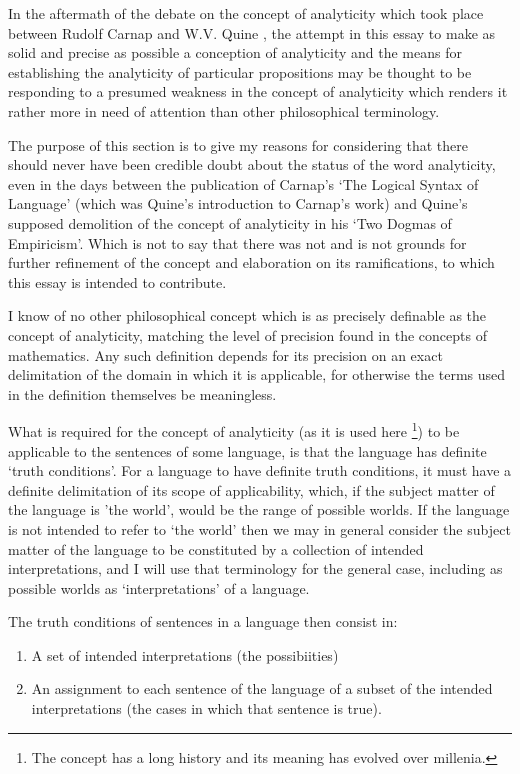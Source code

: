 \documentclass[10pt,titlepage]{article}
\begin{document}
In the aftermath of the debate on the concept of analyticity which took place between Rudolf Carnap and W.V. Quine \cite{carnap90}, the attempt in this essay to make as solid and precise as possible a conception of analyticity and the means for establishing the analyticity of particular propositions may be thought to be responding to a presumed weakness in the concept of analyticity which renders it rather more in need of attention than other philosophical terminology.

The purpose of this section is to give my reasons for considering that there should never have been credible doubt about the status of the word analyticity, even in the days between the publication of Carnap's `The Logical Syntax of Language' (which was Quine's introduction to Carnap's work) and Quine's supposed demolition of the concept of analyticity in his `Two Dogmas of Empiricism'.
Which is not to say that there was not and is not grounds for further refinement of the concept and elaboration on its ramifications, to which this essay is intended to contribute.

I know of no other philosophical concept which is as precisely definable as the concept of analyticity, matching the level of precision found in the concepts of mathematics.
Any such definition depends for its precision on an exact delimitation of the domain in which it is applicable, for otherwise the terms used in the definition themselves be meaningless.

What is required for the concept of analyticity (as it is used here%
\footnote{The concept has a long history and its meaning has evolved over millenia.}) to be applicable to the sentences of some language, is that the language has definite `truth conditions'.
For a language to have definite truth conditions, it must have a definite delimitation of its scope of applicability, which, if the subject matter of the language is 'the world', would be the range of possible worlds.
If the language is not intended to refer to `the world' then we may in general consider the subject matter of the language to be constituted by a collection of intended interpretations, and I will use that terminology for the general case, including as possible worlds as `interpretations' of a language.

The truth conditions of sentences in a language then consist in:

\begin{enumerate}
\item A set of intended interpretations (the possibiities)
  \item An assignment to each sentence of the language of a subset of the intended interpretations (the cases in which that sentence is true).
\end{enumerate}
\end{document}
